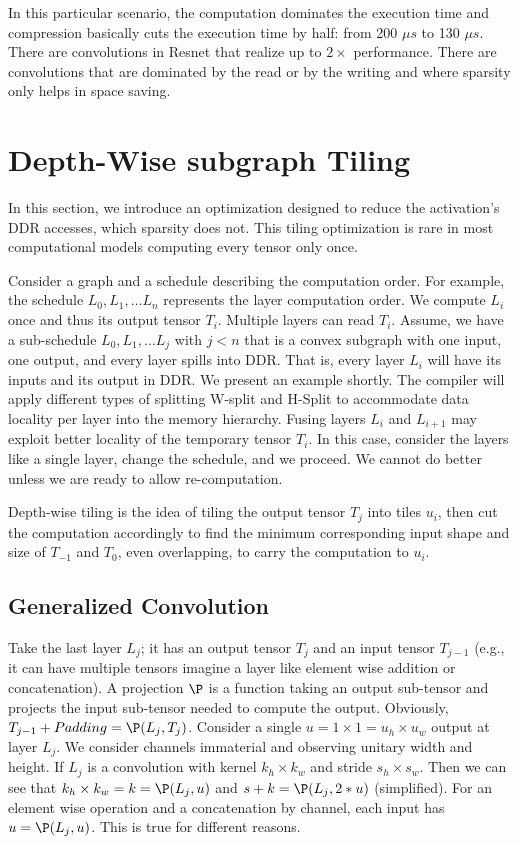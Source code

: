 \documentclass[conference]{IEEEtran}
\begin{document}
In this particular scenario, the computation dominates the execution
time and compression basically cuts the execution time by half: from
200 $\mu s$ to 130 $\mu s$. There are convolutions in Resnet that
realize up to $2\times$ performance. There are convolutions that are
dominated by the read or by the writing and where sparsity only helps
in space saving.



\section{Depth-Wise subgraph Tiling}
In this section, we introduce an optimization designed to reduce the
activation's DDR accesses, which sparsity does not. This tiling
optimization is rare in most computational models computing every
tensor only once.

Consider a graph and a schedule describing the computation order. For
example, the schedule $L_0, L_1, \dots L_n$ represents the layer
computation order. We compute $L_i$ once and thus its output tensor
$T_i$.  Multiple layers can read $T_i$. Assume, we have a sub-schedule
$L_0, L_1, \dots L_j$ with $j<n$ that is a convex subgraph with one
input, one output, and every layer spills into DDR. That is, every
layer $L_i$ will have its inputs and its output in DDR. We present an
example shortly. The compiler will apply different types of splitting
W-split and H-Split to accommodate data locality per layer into the
memory hierarchy.  Fusing layers $L_i$ and $L_{i+1}$ may exploit
better locality of the temporary tensor $T_i$. In this case, consider
the layers like a single layer, change the schedule, and we
proceed. We cannot do better unless we are ready to allow
re-computation.

Depth-wise tiling is the idea of tiling the output tensor $T_j$ into
tiles $u_i$, then cut the computation accordingly to find the minimum
corresponding input shape and size of $T_{-1}$ and $T_0$, even
overlapping, to carry the computation to $u_i$.

\subsection{Generalized Convolution} 
Take the last layer $L_j$; it has an output tensor $T_j$ and an input
tensor $T_{j-1}$ (e.g., it can have multiple tensors imagine a layer
like element wise addition or concatenation). A projection $\P$ is a
function taking an output sub-tensor and projects the input sub-tensor
needed to compute the output. Obviously, $T_{j-1} + Padding =
\P(L_j,T_j)$. Consider a single $u = 1\times 1 = u_h \times u_w$
output at layer $L_j$. We consider channels immaterial and observing
unitary width and height. If $L_j$ is a convolution with kernel
$k_h\times k_w$ and stride $s_h \times s_w$. Then we can see that
$k_h\times k_w = k = \P(L_j,u)$ and $s+k = \P(L_j,2*u)$ (simplified).
For an element wise operation and a concatenation by channel, each
input has $u = \P(L_j,u)$. This is true for different reasons.
\end{document}
